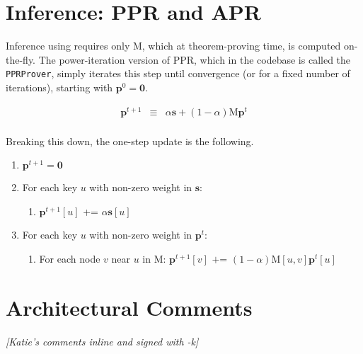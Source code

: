 \documentclass[12pt]{article}
\newcommand{\vek}[1]{\textbf{#1}}
\newcommand{\M}{\textrm{M}}
\begin{document}
\section{Inference: PPR and APR}

Inference using requires only $\M$, which at theorem-proving time, is
computed on-the-fly.  The power-iteration version of PPR, which in the
codebase is called the \texttt{PPRProver}, simply iterates this step
until convergence (or for a fixed number of iterations), starting with
$\vek{p}^0=\vek{0}$.

\begin{eqnarray}
\vek{p}^{t+1} & \equiv & \alpha \vek{s} + (1-\alpha) \M \vek{p}^t \\
\end{eqnarray}

Breaking this down, the one-step update is the following.

\begin{enumerate}
\item $\vek{p}^{t+1} = \vek{0}$
\item For each key $u$ with non-zero weight in $\vek{s}$:
  \begin{enumerate}
  \item $\vek{p}^{t+1}[u]$ += $\alpha \vek{s}[u]$
  \end{enumerate}
\item For each key $u$ with non-zero weight in $\vek{p}^t$:
  \begin{enumerate}
  \item For each node $v$ near $u$ in $\M$:
\(
       \vek{p}^{t+1}[v] \mbox{~+=~} (1-\alpha) \M[u,v] \vek{p}^t[u]
\)
  \end{enumerate}
\end{enumerate}



\section{Architectural Comments}

\emph{ [Katie's comments inline and signed with -k]}
\end{document}
